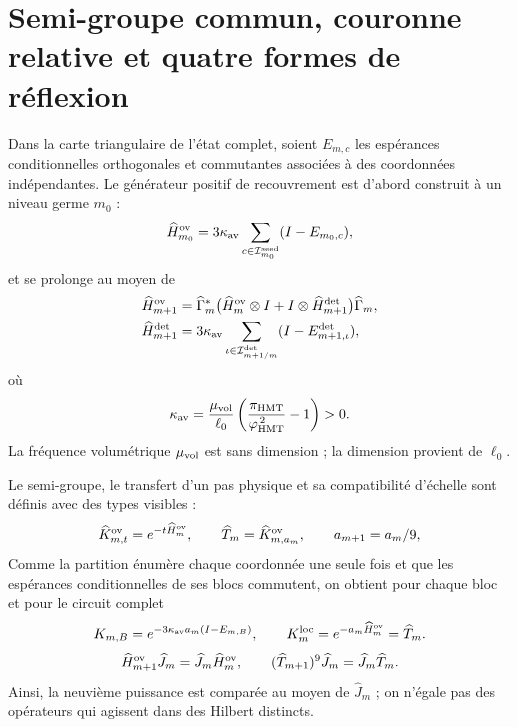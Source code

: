\section*{Semi-groupe commun, couronne relative et quatre formes de réflexion}

Dans la carte triangulaire de l’état complet, soient \(E_{m,c}\) les espérances
conditionnelles orthogonales et commutantes associées à des coordonnées
indépendantes. Le générateur positif de recouvrement est d’abord construit à
un niveau germe \(m_0\) :
\begin{equation}\label{eq:realizaciones-ym-generador}
 \widehat H_{m_0}^{\rm ov}
 =3\kappa_{\rm av}
  \sum_{c\in\mathcal I_{m_0}^{\rm seed}}(I-E_{m_0,c}),
\end{equation}
et se prolonge au moyen de
\begin{equation}\label{eq:realizaciones-ym-generador-refinado}
 \begin{aligned}
 \widehat H_{m+1}^{\rm ov}
 &=\widehat\Gamma_m^*
   \bigl(\widehat H_m^{\rm ov}\otimes I+
         I\otimes\widehat H_{m+1}^{\rm det}\bigr)
   \widehat\Gamma_m,\\
 \widehat H_{m+1}^{\rm det}
 &=3\kappa_{\rm av}
   \sum_{\iota\in\mathcal I_{m+1/m}^{\rm det}}
   (I-E_{m+1,\iota}^{\rm det}),
 \end{aligned}
\end{equation}
où
\begin{equation}\label{eq:realizaciones-ym-kappa}
 \kappa_{\rm av}
 =\frac{\mu_{\rm vol}}{\ell_0}
  \left(\frac{\pi_{\rm HMT}}{\varphi_{\rm HMT}^{\,2}}-1\right)>0.
\end{equation}
La fréquence volumétrique \(\mu_{\rm vol}\) est sans dimension ; la dimension provient de \(\ell_0\).

Le semi-groupe, le transfert d'un pas physique et sa compatibilité d'échelle sont définis avec des types visibles :
\begin{equation}\label{eq:realizaciones-ym-semigrupo}
 \widehat K_{m,t}^{\rm ov}=e^{-t\widehat H_m^{\rm ov}},
 \qquad
 \widehat T_m=\widehat K_{m,a_m}^{\rm ov},
 \qquad a_{m+1}=a_m/9,
\end{equation}
Comme la partition énumère chaque coordonnée une seule fois et que les espérances
conditionnelles de ses blocs commutent, on obtient pour chaque bloc et pour le circuit
complet
\begin{equation}\label{eq:realizaciones-ym-circuito-semigrupo}
 K_{m,B}=e^{-3\kappa_{\rm av}a_m(I-E_{m,B})},
 \qquad
 K_m^{\rm loc}=e^{-a_m\widehat H_m^{\rm ov}}=\widehat T_m.
\end{equation}
\begin{equation}\label{eq:realizaciones-ym-semigrupo-entrelazado}
 \widehat H_{m+1}^{\rm ov}\widehat J_m
 =\widehat J_m\widehat H_m^{\rm ov},
 \qquad
 (\widehat T_{m+1})^9\widehat J_m
 =\widehat J_m\widehat T_m.
\end{equation}
Ainsi, la neuvième puissance est comparée au moyen de \(\widehat J_m\) ; on n’égale pas
des opérateurs qui agissent dans des Hilbert distincts.


